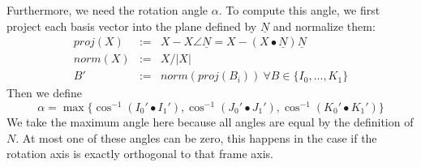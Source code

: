 \documentclass[journal, letterpaper]{IEEEtran}
\begin{document}
Furthermore, we need the rotation angle $\alpha$. To compute this angle, we first project each basis vector into the plane defined by $\underline{N}$ and normalize them:
\begin{equation}
\begin{array}{lcl}
 proj(X) &:=& X - X\angle\underline{N} = X - (X \bullet \underline{N})\underline{N} \\
 norm(X) &:=& X / |X| \\
 B' &:=& norm(proj(B_i)) \ \forall B \in \{I_0,...,K_1\}
\end{array}
\label{eq:ProjBasis}
\end{equation}
Then we define
\begin{equation}
 \alpha = \max \{ \cos^{-1}(I_0' \bullet I_1'), \cos^{-1}(J_0' \bullet J_1'), \cos^{-1}(K_0' \bullet K_1') \}
\label{eq:}
\end{equation}
We take the maximum angle here because all angles are equal by the definition of $N$. At most one of these angles can be zero, this happens in the case if the rotation axis is exactly orthogonal to that frame axis.
\end{document}
